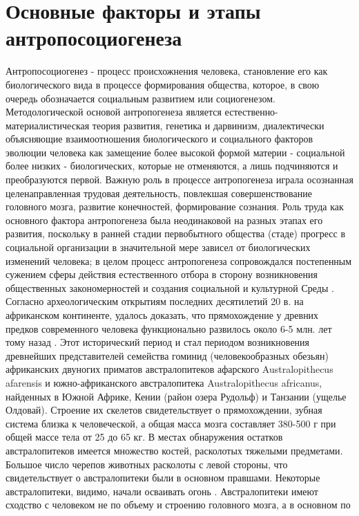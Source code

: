 \documentclass[12pt]{article}
\begin{document}
\section{Основные факторы и этапы антропосоциогенеза}
Антропосоциогенез - процесс происхожнения человека, становление его как биологического вида в процессе
формирования  общества,  которое,  в  свою  очередь  обозначается  социальным  развитием  или  социогенезом.
Методологической основой антропогенеза является естественно-материалистическая теория развития, генетика
и  дарвинизм,  диалектически  объясняющие  взаимоотношения  биологического  и  социального  факторов
эволюции человека как замещение более высокой формой материи - социальной более низких - биологических,
которые не отменяются, а лишь подчиняются и преобразуются первой.
Важную роль в процессе антропогенеза играла осознанная целенаправленная трудовая деятельность, повлекшая
совершенствование головного мозга, развитие конечностей, формирование сознания. Роль труда как основного
фактора  антропогенеза  была  неодинаковой  на  разных  этапах  его  развития,  поскольку  в  ранней  стадии 
первобытного  общества  (стаде)  прогресс  в  социальной  организации  в  значительной  мере  зависел  от
биологических изменений человека; в целом процесс антропогенеза сопровождался постепенным сужением
сферы действия естественного отбора в сторону возникновения общественных закономерностей и создания
социальной и культурной Среды . 
Согласно  археологическим  открытиям  последних  десятилетий  20  в.  на  африканском  континенте,  удалось
доказать, что прямохождение у древних предков современного человека функционально развилось около 6-5
млн. лет тому назад . Этот исторический период и стал периодом возникновения древнейших представителей
семейства гоминид (человекообразных обезьян) африканских двуногих приматов австралопитеков афарского
Australopithecus afarensis и южно-африканского австралопитека Australopithecus africanus, найденных в Южной
Африке, Кении (район озера Рудольф) и Танзании (ущелье Олдовай). Строение их скелетов свидетельствует о
прямохождении, зубная система близка к человеческой, а общая масса мозга составляет 380-500 г при общей
массе  тела  от  25  до  65  кг.  В  местах  обнаружения  остатков  австралопитеков  имеется  множество  костей,
расколотых  тяжелыми  предметами.  Большое  число  черепов  животных  расколоты  с  левой  стороны,  что
свидетельствует о австралопитеки были в основном правшами. Некоторые австралопитеки, видимо, начали
осваивать огонь .
Австралопитеки имеют сходство с человеком не по объему и строению головного мозга, а в основном по
\end{document}
